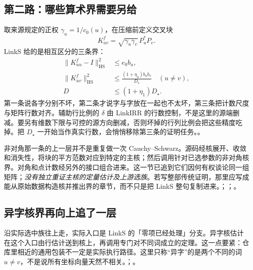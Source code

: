 \subsection{第二路：哪些算术界需要另给}
取来源规定的正权 $\gamma_u=1/c_0(u)$，在压缩前定义交叉块
\[
            K^f_{uv}=\sqrt{\gamma_u\gamma_v}\,P_u^*P_v.
\]
LinkS 给的是相互区分的三条界：
\[
\begin{aligned}
 \|K^f_{uu}-I\|_{\mathrm{HS}}^2&\le e_0 b_u,\\
 \|K^f_{uv}\|_{\mathrm{HS}}^2
       &\le\frac{(1+\eta_0)b_ub_v}{D_\star}\quad(u\ne v),\\
 D&\le(1+\eta_1)D_\star.
\end{aligned}
\]
第一条说各字分别不坏，第二条才说字与字放在一起也不太坏，第三条把计数尺度与矩阵行数对齐。辅助行比例的 $\delta$ 由 LinkIRR 的行数控制，不是这里的源端删减。要另有维数下限与可控的源方向删减，否则坏掉的行列比例会把这些精度吃掉。把 $D_\star$ 一开始当作真实行数，会悄悄移除第三条的证明任务。。

非对角那一条的上一层并不是重复做一次 Cauchy--Schwarz。源码经核展开、收敛和消失性，将块的平方范数对应到特定的主核；然后调用针对已选参数的非对角核界。对角和点计数经另外的接口组合进来。这一节已追到它们因何有权谈论同一组矩阵；\emph{没有独立重证主核的定量估计及上游选族}。若写整部传统证明，那里应写成能从原始数据构造核并推出界的章节，而不只是把 LinkS 整句复制进来。；；。


\subsection{异字核界再向上追了一层}
沿实际选中族往上走，实际入口是 LinkS 的「零项已经处理」分支。异字核估计在这个入口由行估计送到核上，再调用专门对不同词成立的定理。这一点要紧：仓库里相近的通用包装不一定是实际执行路径。这里只称“异字”的是两个不同的词 $u\ne v$，不是说所有坐标向量天然不相关。；。

